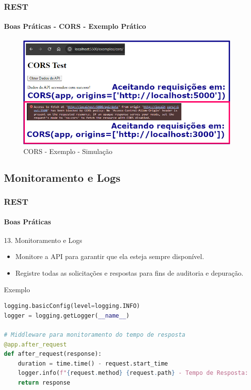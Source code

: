 \documentclass[
	10pt, %
	t, %
]{beamer}
\begin{document}
\begin{frame}
	\frametitle{REST}
	\framesubtitle{Boas Práticas - CORS - Exemplo Prático}

	\begin{figure}
		\includegraphics[width=0.9\linewidth]{cors_test.png}
		\caption{CORS - Exemplo - Simulação}
		\label{fig:cors_example_test}
	\end{figure}

\end{frame}

\subsection{Monitoramento e Logs}

\begin{frame}[fragile]
	\frametitle{REST}
	\framesubtitle{Boas Práticas}

	\begin{block}{13. Monitoramento e Logs}
		\begin{itemize}
			\item Monitore a API para garantir que ela esteja sempre disponível.
			\item Registre todas as solicitações e respostas para fins de auditoria e depuração.
		\end{itemize}
	\end{block}

	\begin{exampleblock}{Exemplo}
		\begin{lstlisting}[language=Python, basicstyle=\small]
logging.basicConfig(level=logging.INFO)
logger = logging.getLogger(__name__)

# Middleware para monitoramento do tempo de resposta
@app.after_request
def after_request(response):
	duration = time.time() - request.start_time
	logger.info(f"{request.method} {request.path} - Tempo de Resposta: {duration:.3f}s")
	return response
		\end{lstlisting}

	\end{exampleblock}

\end{frame}
\end{document}
